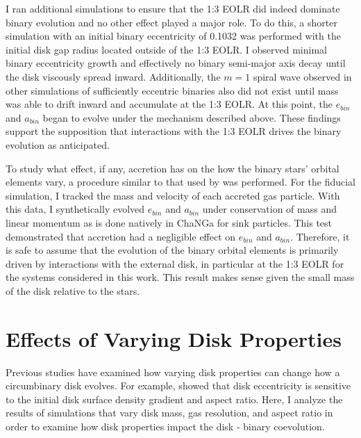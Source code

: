 I ran additional simulations to ensure that  the 1:3 EOLR did indeed dominate binary
evolution and no other effect played a major role.  To do this, a shorter simulation with an initial binary eccentricity of 0.1032 was performed
with the initial disk gap radius located outside of the 1:3 EOLR.
I observed minimal binary eccentricity growth and effectively no binary semi-major
axis decay until the disk viscously spread inward.  Additionally, the $m = 1$ spiral wave observed in other simulations of sufficiently eccentric binaries also did not exist until mass was able to drift inward and accumulate at the 1:3 EOLR. At this point, the $e_{bin}$ and $a_{bin}$ began to evolve under the mechanism described above.  These findings support the supposition that interactions with the 1:3 EOLR drives the binary evolution as anticipated.

To study what effect, if any, accretion has on the how the binary stars' orbital elements vary, a procedure similar to that used by \citet{Roedig2012} 
was performed.  For the fiducial simulation, I tracked the mass and velocity of each accreted gas particle.  With this data, I synthetically evolved $e_{bin}$ and $a_{bin}$ under conservation of mass and linear momentum as is done natively in ChaNGa for sink particles.  This test demonstrated that accretion 
had a negligible effect on $e_{bin}$ and $a_{bin}$.  Therefore, it is safe to assume that the evolution of the binary orbital elements is primarily driven by interactions with the external disk, in particular at the 1:3 EOLR for the systems considered in this work. This result makes sense given the small mass of the disk relative to the stars.


\section{Effects of Varying Disk Properties} \label{CBDisk:sec:VaryingDiscProps}

Previous studies have examined how varying disk properties can change
how a circumbinary disk evolves.  For example, \citet{Lines2015} showed
that disk eccentricity is sensitive to the initial disk surface
density gradient and aspect ratio.  Here, I analyze the results of simulations that vary disk mass, gas resolution, and
aspect ratio in order to examine how disk properties impact the disk - binary coevolution.


